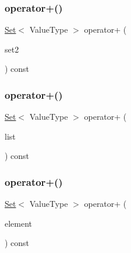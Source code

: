 \mbox{\label{classSet_a8cbf144940ec09832d9bcb053f346933}} 
\subsubsection{\texorpdfstring{operator+()}{operator+()}\hspace{0.1cm}{\footnotesize\ttfamily [1/3]}}
{\footnotesize\ttfamily \mbox{\hyperlink{classSet}{Set}}$<$ Value\+Type $>$ operator+ (\begin{DoxyParamCaption}\item[{const \mbox{\hyperlink{classSet}{Set}}$<$ Value\+Type $>$ \&}]{set2 }\end{DoxyParamCaption}) const}

\mbox{\label{classSet_a34b4a7f2f0e163e185c1b2a0bb40d7d8}} 
\subsubsection{\texorpdfstring{operator+()}{operator+()}\hspace{0.1cm}{\footnotesize\ttfamily [2/3]}}
{\footnotesize\ttfamily \mbox{\hyperlink{classSet}{Set}}$<$ Value\+Type $>$ operator+ (\begin{DoxyParamCaption}\item[{std\+::initializer\+\_\+list$<$ Value\+Type $>$}]{list }\end{DoxyParamCaption}) const}

\mbox{\label{classSet_a057e75a7d4b8ff9453c0a91b652c7f71}} 
\subsubsection{\texorpdfstring{operator+()}{operator+()}\hspace{0.1cm}{\footnotesize\ttfamily [3/3]}}
{\footnotesize\ttfamily \mbox{\hyperlink{classSet}{Set}}$<$ Value\+Type $>$ operator+ (\begin{DoxyParamCaption}\item[{const Value\+Type \&}]{element }\end{DoxyParamCaption}) const}

\mbox{\label{classSet_ab6102e55e47e512960c6e1a075399c0d}} 
